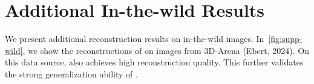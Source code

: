 \section{Additional In-the-wild Results}
\label{sec:wild}                      
We present additional reconstruction results on in-the-wild images. In~\cref{fig:supp-wild}, we show the reconstructions of \method on images from 3D-Arena (Ebert, 2024). On this data source, \method also achieves high reconstruction quality. This further validates the strong generalization ability of \method.